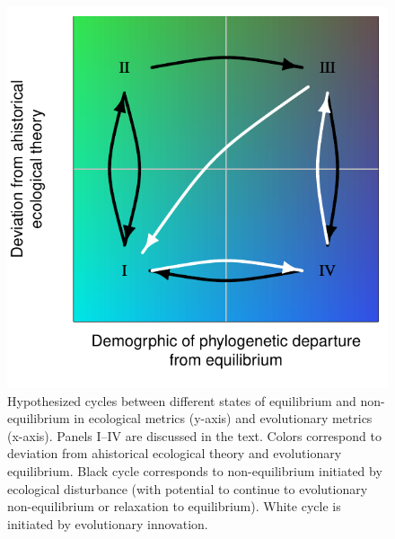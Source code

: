 \documentclass[12pt]{article}
\begin{document}
\begin{figure}[!hbp]
  \centering
  \includegraphics[scale=1]{fig_cycles.pdf}
  \caption{Hypothesized cycles between different states of equilibrium
    and non-equilibrium in ecological metrics (y-axis) and
    evolutionary metrics (x-axis). Panels I--IV are discussed in the
    text.  Colors correspond to deviation from ahistorical ecological
    theory and evolutionary equilibrium.  Black cycle corresponds to
    non-equilibrium initiated by ecological disturbance (with
    potential to continue to evolutionary non-equilibrium or
    relaxation to equilibrium). White cycle is initiated by
    evolutionary innovation.}
  \label{fig:cycles}
\end{figure}
% 
% 
\end{document}
